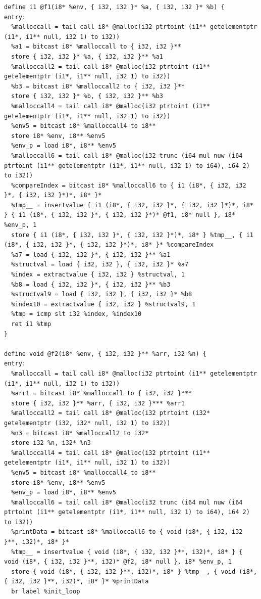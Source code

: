 \documentclass[12pt]{article}
\begin{document}
\begin{mdframed}[hidealllines=true,backgroundcolor=green!10]
\begin{lstlisting}
define i1 @f1(i8* %env, { i32, i32 }* %a, { i32, i32 }* %b) {
entry:
  %malloccall = tail call i8* @malloc(i32 ptrtoint (i1** getelementptr (i1*, i1** null, i32 1) to i32))
  %a1 = bitcast i8* %malloccall to { i32, i32 }**
  store { i32, i32 }* %a, { i32, i32 }** %a1
  %malloccall2 = tail call i8* @malloc(i32 ptrtoint (i1** getelementptr (i1*, i1** null, i32 1) to i32))
  %b3 = bitcast i8* %malloccall2 to { i32, i32 }**
  store { i32, i32 }* %b, { i32, i32 }** %b3
  %malloccall4 = tail call i8* @malloc(i32 ptrtoint (i1** getelementptr (i1*, i1** null, i32 1) to i32))
  %env5 = bitcast i8* %malloccall4 to i8**
  store i8* %env, i8** %env5
  %env_p = load i8*, i8** %env5
  %malloccall6 = tail call i8* @malloc(i32 trunc (i64 mul nuw (i64 ptrtoint (i1** getelementptr (i1*, i1** null, i32 1) to i64), i64 2) to i32))
  %compareIndex = bitcast i8* %malloccall6 to { i1 (i8*, { i32, i32 }*, { i32, i32 }*)*, i8* }*
  %tmp__ = insertvalue { i1 (i8*, { i32, i32 }*, { i32, i32 }*)*, i8* } { i1 (i8*, { i32, i32 }*, { i32, i32 }*)* @f1, i8* null }, i8* %env_p, 1
  store { i1 (i8*, { i32, i32 }*, { i32, i32 }*)*, i8* } %tmp__, { i1 (i8*, { i32, i32 }*, { i32, i32 }*)*, i8* }* %compareIndex
  %a7 = load { i32, i32 }*, { i32, i32 }** %a1
  %structval = load { i32, i32 }, { i32, i32 }* %a7
  %index = extractvalue { i32, i32 } %structval, 1
  %b8 = load { i32, i32 }*, { i32, i32 }** %b3
  %structval9 = load { i32, i32 }, { i32, i32 }* %b8
  %index10 = extractvalue { i32, i32 } %structval9, 1
  %tmp = icmp slt i32 %index, %index10
  ret i1 %tmp
}

define void @f2(i8* %env, { i32, i32 }** %arr, i32 %n) {
entry:
  %malloccall = tail call i8* @malloc(i32 ptrtoint (i1** getelementptr (i1*, i1** null, i32 1) to i32))
  %arr1 = bitcast i8* %malloccall to { i32, i32 }***
  store { i32, i32 }** %arr, { i32, i32 }*** %arr1
  %malloccall2 = tail call i8* @malloc(i32 ptrtoint (i32* getelementptr (i32, i32* null, i32 1) to i32))
  %n3 = bitcast i8* %malloccall2 to i32*
  store i32 %n, i32* %n3
  %malloccall4 = tail call i8* @malloc(i32 ptrtoint (i1** getelementptr (i1*, i1** null, i32 1) to i32))
  %env5 = bitcast i8* %malloccall4 to i8**
  store i8* %env, i8** %env5
  %env_p = load i8*, i8** %env5
  %malloccall6 = tail call i8* @malloc(i32 trunc (i64 mul nuw (i64 ptrtoint (i1** getelementptr (i1*, i1** null, i32 1) to i64), i64 2) to i32))
  %printData = bitcast i8* %malloccall6 to { void (i8*, { i32, i32 }**, i32)*, i8* }*
  %tmp__ = insertvalue { void (i8*, { i32, i32 }**, i32)*, i8* } { void (i8*, { i32, i32 }**, i32)* @f2, i8* null }, i8* %env_p, 1
  store { void (i8*, { i32, i32 }**, i32)*, i8* } %tmp__, { void (i8*, { i32, i32 }**, i32)*, i8* }* %printData
  br label %init_loop


\end{lstlisting}
\end{mdframed}
\end{document}
